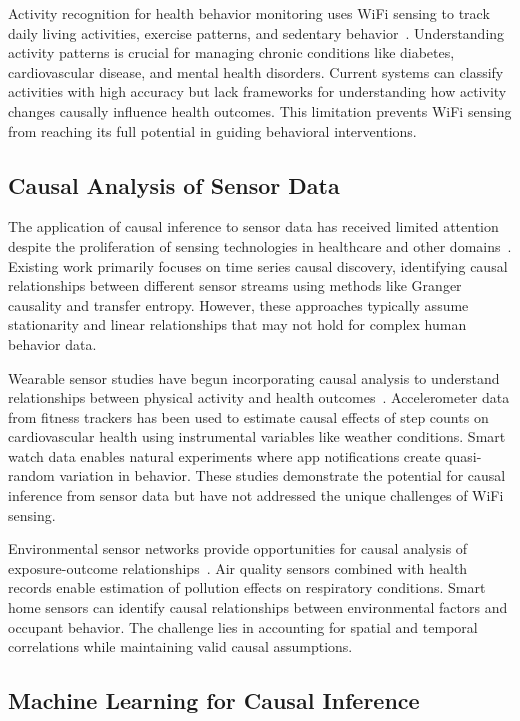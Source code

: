 \documentclass[journal]{IEEEtran}
\begin{document}
Activity recognition for health behavior monitoring uses WiFi sensing to track daily living activities, exercise patterns, and sedentary behavior~\cite{activity2023health}. Understanding activity patterns is crucial for managing chronic conditions like diabetes, cardiovascular disease, and mental health disorders. Current systems can classify activities with high accuracy but lack frameworks for understanding how activity changes causally influence health outcomes. This limitation prevents WiFi sensing from reaching its full potential in guiding behavioral interventions.

\subsection{Causal Analysis of Sensor Data}

The application of causal inference to sensor data has received limited attention despite the proliferation of sensing technologies in healthcare and other domains~\cite{sensor2022causal}. Existing work primarily focuses on time series causal discovery, identifying causal relationships between different sensor streams using methods like Granger causality and transfer entropy. However, these approaches typically assume stationarity and linear relationships that may not hold for complex human behavior data.

Wearable sensor studies have begun incorporating causal analysis to understand relationships between physical activity and health outcomes~\cite{wearable2021causal}. Accelerometer data from fitness trackers has been used to estimate causal effects of step counts on cardiovascular health using instrumental variables like weather conditions. Smart watch data enables natural experiments where app notifications create quasi-random variation in behavior. These studies demonstrate the potential for causal inference from sensor data but have not addressed the unique challenges of WiFi sensing.

Environmental sensor networks provide opportunities for causal analysis of exposure-outcome relationships~\cite{environmental2023causal}. Air quality sensors combined with health records enable estimation of pollution effects on respiratory conditions. Smart home sensors can identify causal relationships between environmental factors and occupant behavior. The challenge lies in accounting for spatial and temporal correlations while maintaining valid causal assumptions.

\subsection{Machine Learning for Causal Inference}
\end{document}
